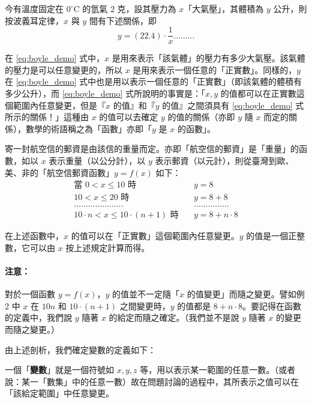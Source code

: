 \begin{example}\label{ex:5-3-1}
今有溫度固定在 $0^\circ\text{C}$ 的氫氣 $2$ 克，設其壓力為 $x$「大氣壓」，其體積為 $y$ 公升，則按波義耳定律，$x$ 與 $y$ 間有下述關係，即
\begin{equation}\label{eq:boyle_demo}
  y = (22.4) \cdot \frac{1}{x} \dots\dots\dots
\end{equation}
\end{example}

在 \eqref{eq:boyle_demo} 式中，$x$ 是用來表示「該氣體」的壓力有多少大氣壓。該氣體的壓力是可以任意變更的，所以 $x$ 是用來表示一個任意的「正實數」。同樣的，$y$ 在 \eqref{eq:boyle_demo} 式中也是用以表示一個任意的「正實數」（即該氣體的體積有多少公升），而 \eqref{eq:boyle_demo} 式所說明的事實是：「$x, y$ 的值都可以在正實數這個範圍內任意變更，但是『$x$ 的值』和『$y$ 的值』之間須具有 \eqref{eq:boyle_demo} 式所示的關係！」這種由 $x$ 的值可以去確定 $y$ 的值的關係（亦即 $y$ 隨 $x$ 而定的關係），數學的術語稱之為「函數」亦即「$y$ 是 $x$ 的函數」。

\begin{example}\label{ex:5-3-2}
寄一封航空信的郵資是由該信的重量而定。亦即「航空信的郵資」是「重量」的函數，如以 $x$ 表示重量（以公分計），以 $y$ 表示郵資（以元計），則從臺灣到歐、美、非的「航空信郵資函數」$y=f(x)$ 如下：
\begin{align*}
  \text{當 } 0 < x \le 10 \text{ 時} \quad & y = 8 \\
  10 < x \le 20 \text{ 時} \quad & y = 8+8 \\
  \dots\dots\dots\dots\dots\dots\dots & \dots\dots\dots\dots\dots \tag{2} \\
  10 \cdot n < x \le 10 \cdot (n+1) \text{ 時} \quad & y = 8+n \cdot 8
\end{align*}
\end{example}

在上述函數中，$x$ 的值可以在「正實數」這個範圍內任意變更。$y$ 的值是一個正整數，它可以由 $x$ 按上述規定計算而得。

\paragraph{注意：}
對於一個函數 $y=f(x)$，$y$ 的值並不一定隨「$x$ 的值變更」而隨之變更。譬如例 2 中 $x$ 在 $10n$ 和 $10 \cdot (n+1)$ 之間變更時，$y$ 的值都是 $8+n \cdot 8$。要記得在函數的定義中，我們說 $y$ 隨著 $x$ 的給定而隨之確定。（我們並不是說 $y$ 隨著 $x$ 的變更而隨之變更。）

由上述剖析，我們確定變數的定義如下：
\begin{definition*}
一個「\textbf{變數}」就是一個符號如 $x, y, z$ 等，用以表示某一範圍的任意一數。（或者說：某一「數集」中的任意一數）故在問題討論的過程中，其所表示之值可以在「該給定範圍」中任意變更。
\end{definition*}

